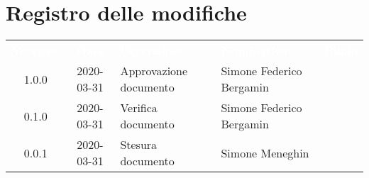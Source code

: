 \section*{Registro delle modifiche}
{
	\centering
	\begin{longtable}{ c c  C{4cm} C{4cm} C{3cm} }
		\textcolor{white}{\textbf{Versione}} & \textcolor{white}{\textbf{Data}} & \textcolor{white}{\textbf{Descrizione}} & \textcolor{white}{\textbf{Nominativo}} & \textcolor{white}{\textbf{Ruolo}}\\		
		1.0.0 & 2020-03-31 & Approvazione documento & Simone Federico Bergamin &\RdP{}\\		
		0.1.0 & 2020-03-31 & Verifica documento & Simone Federico Bergamin &\ver{}\\		
		0.0.1 & 2020-03-31 & Stesura documento & Simone Meneghin &\reda{}\\		
		
	\end{longtable}

}